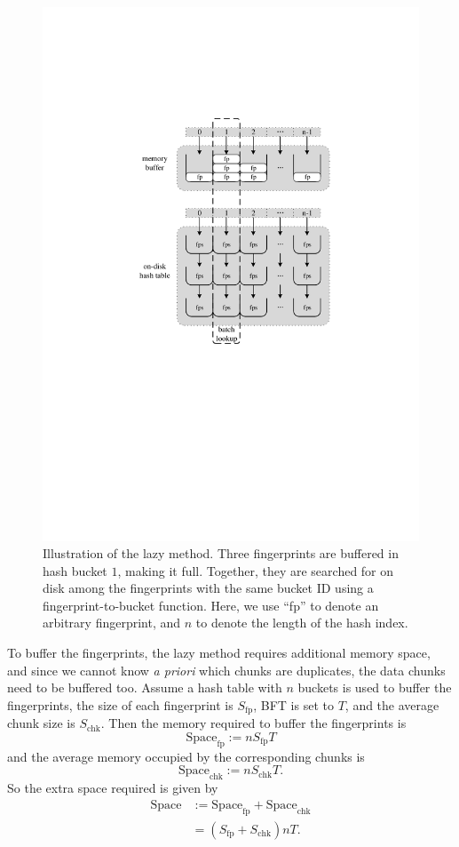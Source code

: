 \documentclass[prodmode,acmtecs]{acmsmall}
\begin{document}
\begin{figure}[htbp]
  \begin{center}
  \includegraphics[width=0.6\columnwidth]{idea}
  \end{center}
  \caption{Illustration of the lazy method.  Three fingerprints are buffered in hash bucket $1$, making it full. Together, they are searched for on disk among the fingerprints with the same bucket ID using a fingerprint-to-bucket function.  Here, we use ``fp'' to denote an arbitrary fingerprint, and $n$ to denote the length of the hash index.}
  \label{fig:lazy-method}
\end{figure}

To buffer the fingerprints, the lazy method requires additional memory space, and since we cannot know \textit{a priori} which chunks are duplicates, the data chunks need to be buffered too. Assume a hash table with $n$ buckets is used to buffer the fingerprints, the size of each fingerprint is $S_\text{fp}$, BFT is set to $T$, and the average chunk size is $S_\text{chk}$. Then the memory required to buffer the fingerprints is $$\text{Space}_\text{fp}:=n S_\text{fp}T$$ and the average memory occupied by the corresponding chunks is $$\text{Space}_\text{chk}:=n S_\text{chk}T.$$ So the extra space required is given by 
\begin{align*}
\mathrm{Space} &:=\mathrm{Space}_\text{fp}+\mathrm{Space}_\text{chk} \\
 &=(S_\text{fp}+S_\text{chk})n T.
\end{align*}
\end{document}
